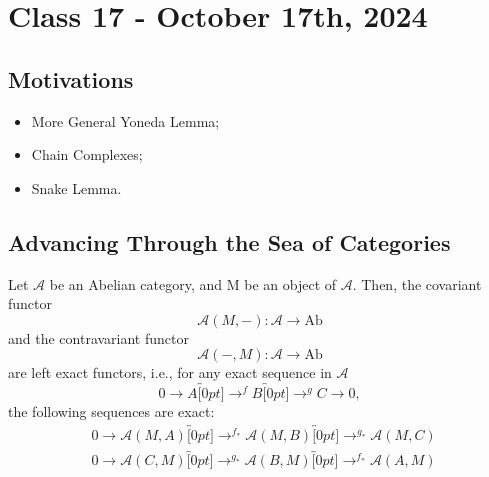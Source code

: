 \documentclass[../category_theory.tex]{subfiles}
\begin{document}
\section{Class 17 - October 17th, 2024}
\subsection{Motivations}
\begin{itemize}
	\item More General Yoneda Lemma;
	\item Chain Complexes;
	\item Snake Lemma.
\end{itemize}
\subsection{Advancing Through the Sea of Categories}
\begin{prop*}
	Let \(\mathcal{A}\) be an Abelian category, and M be an object of \(\mathcal{A}\). Then, the covariant functor
	\[
		\mathcal{A}(M, -):\mathcal{A}\rightarrow \mathrm{Ab}
	\]
	and the contravariant functor
	\[
		\mathcal{A}(-, M):\mathcal{A}\rightarrow \mathrm{Ab}
	\]
	are left exact functors, i.e., for any exact sequence in \(\mathcal{A}\)
	\[
		0\rightarrow A\overbracket[0pt]{\rightarrow}^{f}B\overbracket[0pt]{\rightarrow}^{g}C\rightarrow 0,
	\]
	the following sequences are exact:
	\begin{align}
		 & 0\rightarrow \mathcal{A}(M, A)\overbracket[0pt]{\rightarrow}^{f_{*}}\mathcal{A}(M, B)\overbracket[0pt]{\rightarrow}^{g_{*}}\mathcal{A}(M, C)  \\
		 & 0\rightarrow \mathcal{A}(C, M)\overbracket[0pt]{\rightarrow}^{g_{*}}\mathcal{A}(B, M)\overbracket[0pt]{\rightarrow}^{f_{*}}\mathcal{A}(A, M)\
	\end{align}
\end{prop*}
\end{document}
